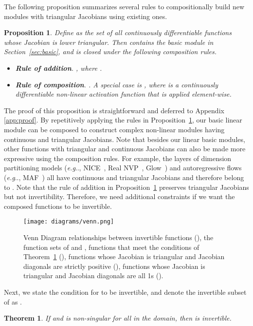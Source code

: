 \documentclass{article}
\makeatletter
\newtheorem{theorem}{Theorem}
\newtheorem{proposition}{Proposition}
\def\@onedot{\ifx\@let@token.\else.\null\fi\xspace}
\DeclareRobustCommand\onedot{\futurelet\@let@token\@onedot}
\newcommand{\secref}[1]{Section~\ref{#1}}
\newcommand{\thmref}[1]{Theorem~\ref{#1}}
\newcommand{\propref}[1]{Proposition~\ref{#1}}
\def\eg{\emph{e.g}\onedot}
\makeatother
\begin{document}
The following proposition summarizes several rules to compositionally build new modules with triangular Jacobians using existing ones.
\begin{proposition}\label{prop:calculus}
Define  as the set of all continuously differentiable functions whose Jacobian is lower triangular. Then  contains the basic module in \secref{sec:basic}, and is closed under the following composition rules.
\begin{itemize}
    \item \textbf{Rule of addition}. , where . \item \textbf{Rule of composition}. . A special case is , where  is a continuously differentiable non-linear activation function that is applied element-wise.\end{itemize}
\end{proposition}
The proof of this proposition is straightforward and deferred to Appendix \ref{app:proof}. By repetitively applying the rules in \propref{prop:calculus}, our basic linear module can be composed to construct 
complex non-linear modules having continuous and triangular Jacobians. Note that besides our linear basic modules, other functions with triangular and continuous Jacobians can also be made more expressive using the composition rules. For example, the layers of dimension partitioning models (\eg, NICE~\cite{dinh2016density}, Real NVP~\cite{nvp}, Glow~\cite{glow}) and autoregressive flows (\eg, MAF~\cite{maf}) all have continuous and triangular Jacobians and therefore belong to . Note that the rule of addition in \propref{prop:calculus} preserves triangular Jacobians but not invertibility. Therefore, we need additional constraints if we want the composed functions to be invertible.

\begin{figure}
    \centering
    \texttt{[image: diagrams/venn.png]}
    \caption{Venn Diagram relationships between invertible functions (), the function sets of  and , functions that meet the conditions of \thmref{thm:invert} (), functions whose Jacobian is triangular and Jacobian diagonals are strictly positive (), functions whose Jacobian is triangular and Jacobian diagonals are all 1s ().}
    \label{fig:venn}
\end{figure}


Next, we state the condition for  to be invertible, and denote the invertible subset of  as . \begin{theorem}\label{thm:invert}
If  and  is non-singular for all  in the domain, then  is invertible.
\end{theorem}
\end{document}
